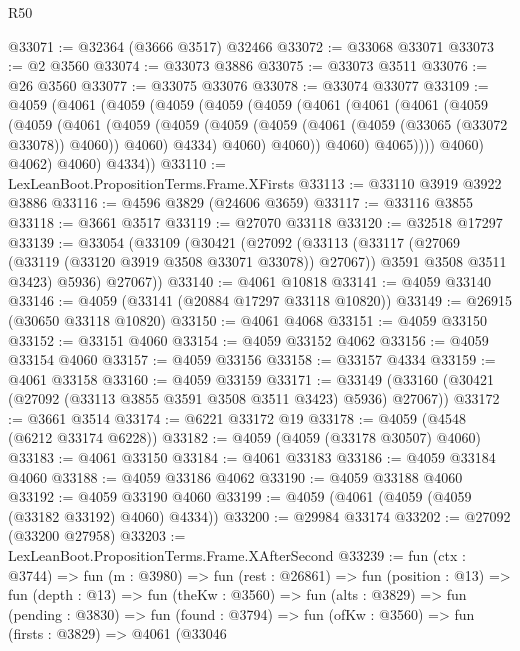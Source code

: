 \begin{lexlean}{R50}
\begin{coremodule}
@33071 := @32364 (@3666 @3517) @32466
@33072 := @33068 @33071
@33073 := @2 @3560
@33074 := @33073 @3886
@33075 := @33073 @3511
@33076 := @26 @3560
@33077 := @33075 @33076
@33078 := @33074 @33077
@33109 := @4059
    (@4061
      (@4059
        (@4059
          (@4059
            (@4059
              (@4061
                (@4061
                  (@4061
                    (@4059
                      (@4059
                        (@4061
                          (@4059
                            (@4059
                              (@4059
                                (@4059 (@4061 (@4059 (@33065 (@33072 @33078)) @4060)) @4060)
                                @4334)
                              @4060)
                            @4060))
                        @4060)
                      @4065))))
              @4060)
            @4062)
          @4060)
        @4334))
@33110 := LexLeanBoot.PropositionTerms.Frame.XFirsts
@33113 := @33110 @3919 @3922 @3886
@33116 := @4596 @3829 (@24606 @3659)
@33117 := @33116 @3855
@33118 := @3661 @3517
@33119 := @27070 @33118
@33120 := @32518 @17297
@33139 := @33054
    (@33109
      (@30421
        (@27092
          (@33113
            (@33117 (@27069 (@33119 (@33120 @3919 @3508 @33071 @33078)) @27067))
            @3591
            @3508
            @3511
            @3423)
          @5936)
        @27067))
@33140 := @4061 @10818
@33141 := @4059 @33140
@33146 := @4059 (@33141 (@20884 @17297 @33118 @10820))
@33149 := @26915 (@30650 @33118 @10820)
@33150 := @4061 @4068
@33151 := @4059 @33150
@33152 := @33151 @4060
@33154 := @4059 @33152 @4062
@33156 := @4059 @33154 @4060
@33157 := @4059 @33156
@33158 := @33157 @4334
@33159 := @4061 @33158
@33160 := @4059 @33159
@33171 := @33149 (@33160 (@30421 (@27092 (@33113 @3855 @3591 @3508 @3511 @3423) @5936) @27067))
@33172 := @3661 @3514
@33174 := @6221 @33172 @19
@33178 := @4059 (@4548 (@6212 @33174 @6228))
@33182 := @4059 (@4059 (@33178 @30507) @4060)
@33183 := @4061 @33150
@33184 := @4061 @33183
@33186 := @4059 @33184 @4060
@33188 := @4059 @33186 @4062
@33190 := @4059 @33188 @4060
@33192 := @4059 @33190 @4060
@33199 := @4059 (@4061 (@4059 (@4059 (@33182 @33192) @4060) @4334))
@33200 := @29984 @33174
@33202 := @27092 (@33200 @27958)
@33203 := LexLeanBoot.PropositionTerms.Frame.XAfterSecond
@33239 := fun (ctx : @3744) =>
  fun (m : @3980) =>
  fun (rest : @26861) =>
  fun (position : @13) =>
  fun (depth : @13) =>
  fun (theKw : @3560) =>
  fun (alts : @3829) =>
  fun (pending : @3830) =>
  fun (found : @3794) =>
  fun (ofKw : @3560) =>
  fun (firsts : @3829) =>
  @4061
    (@33046

\end{coremodule}
\end{lexlean}
